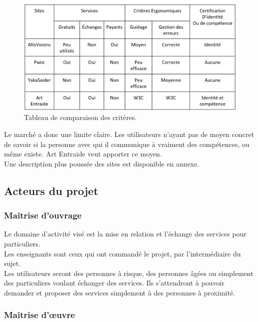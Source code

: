 \documentclass[a4paper,11pt]{article}
\begin{document}
\begin{figure}[H]
  \includegraphics[width=\linewidth]{images/tableau-ergo.png}
  \caption{Tableau de comparaison des critères.}
  \label{fig:table1}
\end{figure}

Le marché a donc une limite claire. Les utilisateurs n'ayant pas de moyen concret de savoir si la personne avec qui il communique à vraiment des compétences, ou même existe.
Art Entraide veut apporter ce moyen.\\

Une description plus poussée des sites est disponible en annexe.\\

\subsection{Acteurs du projet}
\subsubsection{Maîtrise d’ouvrage}

Le domaine d’activité visé est la mise en relation et l’échange des services pour particuliers.\\

Les enseignants sont ceux qui ont commandé le projet, par l’intermédiaire du sujet.\\

Les utilisateurs seront des personnes à risque, des personnes âgées ou simplement des particuliers
voulant échanger des services. Ils s’attendront à pouvoir demander et proposer des services
simplement à des personnes à proximité.\\

\subsubsection{Maîtrise d'œuvre}
\end{document}
